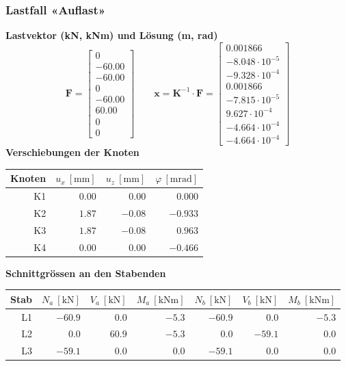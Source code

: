 \documentclass[11pt,a4paper]{article}
\begin{document}
\subsubsection{Lastfall «Auflast»}
\noindent\textbf{Lastvektor (kN, kNm) und Lösung (m, rad)}
\begin{equation*}
\mathbf{F} = \begin{bmatrix} 0 \\ -60.00 \\ -60.00 \\ 0 \\ -60.00 \\ 60.00 \\ 0 \\ 0 \end{bmatrix} \qquad \mathbf{x} = \mathbf{K}^{-1} \cdot \mathbf{F} = \begin{bmatrix} 0.001866 \\ -8.048 \cdot 10^{-5} \\ -9.328 \cdot 10^{-4} \\ 0.001866 \\ -7.815 \cdot 10^{-5} \\ 9.627 \cdot 10^{-4} \\ -4.664 \cdot 10^{-4} \\ -4.664 \cdot 10^{-4} \end{bmatrix}
\end{equation*}
\noindent\textbf{Verschiebungen der Knoten}
\begin{longtable}{rrrr}
\hline
Knoten & $u_x\ [\mathrm{mm}]$ & $u_z\ [\mathrm{mm}]$ & $\varphi\ [\mathrm{mrad}]$ \\
\hline
\endhead
K1 & $0.00$ & $0.00$ & $0.000$ \\
K2 & $1.87$ & $-0.08$ & $-0.933$ \\
K3 & $1.87$ & $-0.08$ & $0.963$ \\
K4 & $0.00$ & $0.00$ & $-0.466$ \\
\hline
\end{longtable}
\noindent\textbf{Schnittgrössen an den Stabenden}
\begin{longtable}{rrrrrrr}
\hline
Stab & $N_{a}\ [\mathrm{kN}]$ & $V_{a}\ [\mathrm{kN}]$ & $M_{a}\ [\mathrm{kNm}]$ & $N_{b}\ [\mathrm{kN}]$ & $V_{b}\ [\mathrm{kN}]$ & $M_{b}\ [\mathrm{kNm}]$ \\
\hline
\endhead
L1 & $-60.9$ & $0.0$ & $-5.3$ & $-60.9$ & $0.0$ & $-5.3$ \\
L2 & $0.0$ & $60.9$ & $-5.3$ & $0.0$ & $-59.1$ & $0.0$ \\
L3 & $-59.1$ & $0.0$ & $0.0$ & $-59.1$ & $0.0$ & $0.0$ \\
\hline
\end{longtable}
\end{document}
